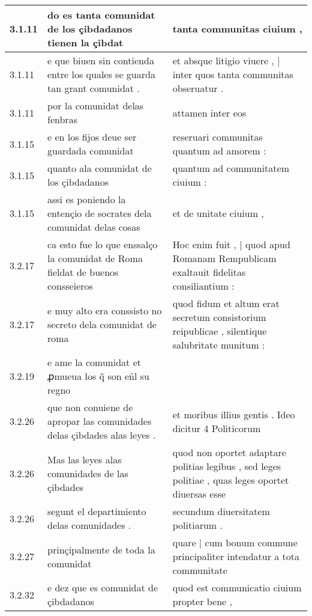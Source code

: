 \begin{tabular}{|p{1cm}|p{6.5cm}|p{6.5cm}|}
3.1.11 & do es tanta comunidat de los çibdadanos tienen la çibdat & tanta communitas ciuium , \\\hline
3.1.11 & e que biuen sin contienda entre los quales se guarda tan grant comunidat . & et absque litigio viuere , | inter quos tanta communitas obseruatur . \\\hline
3.1.11 & por la comunidat delas fenbras & attamen inter eos \\\hline
3.1.15 & e en los fijos deue ser guardada comunidat & reseruari communitas quantum ad amorem : \\\hline
3.1.15 & quanto ala comunidat de los çibdadanos & quantum ad communitatem ciuium : \\\hline
3.1.15 & assi es poniendo la entençio de socrates dela comunidat delas cosas & et de unitate ciuium , \\\hline
3.2.17 & ca esto fue lo que enssalço la comunidat de Roma fieldat de buenos consseieros & Hoc enim fuit , | quod apud Romanam Rempublicam exaltauit fidelitas consiliantium : \\\hline
3.2.17 & e muy alto era conssisto no secreto dela comunidat de roma & quod fidum et altum erat secretum consistorium reipublicae , silentique salubritate munitum : \\\hline
3.2.19 & e ame la comunidat et ꝓmueua los q̃ son eñl su regno &  \\\hline
3.2.26 & que non conuiene de apropar las comunidades delas çibdades alas leyes . & et moribus illius gentis . Ideo dicitur 4 Politicorum \\\hline
3.2.26 & Mas las leyes alas comunidades de las çibdades & quod non oportet adaptare politias legibus , sed leges politiae , quas leges oportet diuersas esse \\\hline
3.2.26 & segunt el departimiento delas comunidades . & secundum diuersitatem politiarum . \\\hline
3.2.27 & prinçipalmente de toda la comunidat & quare | cum bonum commune principaliter intendatur a tota communitate \\\hline
3.2.32 & e dez que es comunidat de çibdadanos & quod est communicatio ciuium propter bene , \\\hline

\end{tabular}
